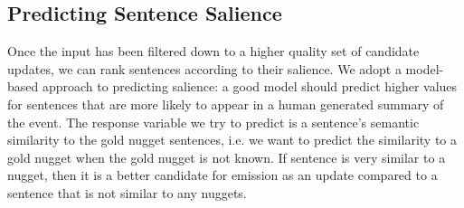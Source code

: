 \subsection{Predicting Sentence Salience}
\label{subsec:Predict}
Once the input has been filtered down to a higher quality set of candidate updates, we can rank sentences according to their salience.  We adopt a model-based approach to predicting salience: a good model should predict higher values for sentences that are more likely to appear in a human generated summary of the event.   The response variable we try to predict is a sentence's semantic similarity \cite{guo:wtmf} to the gold nugget sentences, i.e. we want to predict the similarity to a gold nugget when the gold nugget is not known.  If sentence is very similar to a nugget, then it is a better candidate for emission as an update compared to a sentence that is not similar to any nuggets.

